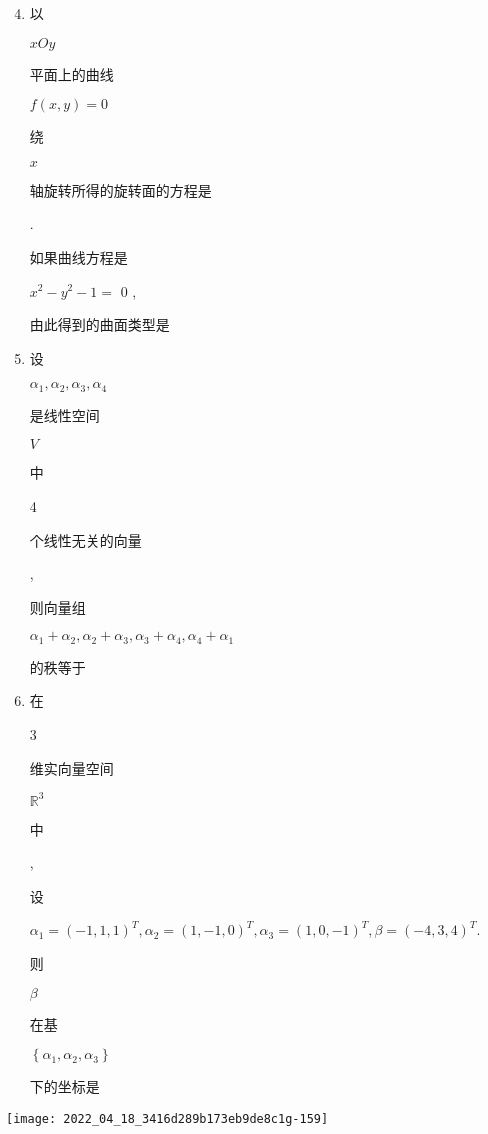 \documentclass[10pt]{article}
\begin{document}
\begin{enumerate}
  \setcounter{enumi}{3}
  \item \begin{CJK}{UTF8}{mj}以\end{CJK} $x O y$ \begin{CJK}{UTF8}{mj}平面上的曲线\end{CJK} $f(x, y)=0$ \begin{CJK}{UTF8}{mj}绕\end{CJK} $x$ \begin{CJK}{UTF8}{mj}轴旋转所得的旋转面的方程是\end{CJK} . \begin{CJK}{UTF8}{mj}如果曲线方程是\end{CJK} $x^{2}-y^{2}-1=$ 0 , \begin{CJK}{UTF8}{mj}由此得到的曲面类型是\end{CJK}

  \item \begin{CJK}{UTF8}{mj}设\end{CJK} $\alpha_{1}, \alpha_{2}, \alpha_{3}, \alpha_{4}$ \begin{CJK}{UTF8}{mj}是线性空间\end{CJK} $V$ \begin{CJK}{UTF8}{mj}中\end{CJK} 4 \begin{CJK}{UTF8}{mj}个线性无关的向量\end{CJK}, \begin{CJK}{UTF8}{mj}则向量组\end{CJK} $\alpha_{1}+\alpha_{2}, \alpha_{2}+\alpha_{3}, \alpha_{3}+\alpha_{4}, \alpha_{4}+\alpha_{1}$ \begin{CJK}{UTF8}{mj}的秩等于\end{CJK}

  \item \begin{CJK}{UTF8}{mj}在\end{CJK} 3 \begin{CJK}{UTF8}{mj}维实向量空间\end{CJK} $\mathbb{R}^{3}$ \begin{CJK}{UTF8}{mj}中\end{CJK}, \begin{CJK}{UTF8}{mj}设\end{CJK} $\alpha_{1}=(-1,1,1)^{T}, \alpha_{2}=(1,-1,0)^{T}, \alpha_{3}=(1,0,-1)^{T}, \beta=(-4,3,4)^{T}$. \begin{CJK}{UTF8}{mj}则\end{CJK} $\beta$ \begin{CJK}{UTF8}{mj}在基\end{CJK} $\left\{\alpha_{1}, \alpha_{2}, \alpha_{3}\right\}$ \begin{CJK}{UTF8}{mj}下的坐标是\end{CJK}

\end{enumerate}
\texttt{[image: 2022\_04\_18\_3416d289b173eb9de8c1g-159]}
\end{document}
